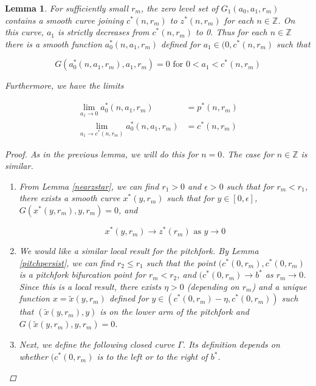 \documentclass[12pt]{article}
\def\Z{{\mathbb Z}}
\newtheorem{lemma}{Lemma}
\begin{document}
\begin{lemma}
For sufficiently small $r_m$, the zero level set of $G_1(a_0, a_1, r_m)$ contains a smooth curve joining $c^*(n, r_m)$ to $z^*(n, r_m)$ for each $n \in \Z$. On this curve, $a_1$ is strictly decreases from $c^*(n, r_m)$ to 0. Thus for each $n \in \Z$ there is a smooth function $a_0^*(n, a_1, r_m)$ defined for $a_1 \in (0, c^*(n, r_m)$ such that 

\begin{equation}
G(a_0^*(n, a_1, r_m), a_1, r_m) = 0 \text{  for  }
0 < a_1 < c^*(n, r_m)
\end{equation}

Furthermore, we have the limits

\begin{align*}
\lim_{a_1 \rightarrow 0} a_0^*(n, a_1, r_m) &= p^*(n, r_m) \\
\lim_{a_1 \rightarrow c^*(n, r_m)} a_0^*(n, a_1, r_m) &= c^*(n, r_m)
\end{align*}

\begin{proof}
As in the previous lemma, we will do this for $n = 0$. The case for $n \in \Z$ is similar.

\begin{enumerate}

\item From Lemma \ref{nearzstar}, we can find $r_1 > 0$ and $\epsilon > 0$ such that for $r_m < r_1$, there exists a smooth curve $x^*(y, r_m)$ such that for $y \in [0, \epsilon]$, $G(x^*(y, r_m), y, r_m) = 0$, and

\[
x^*(y, r_m) \rightarrow z^*(r_m) \text{ as } y \rightarrow 0
\]

\item We would like a similar local result for the pitchfork. By Lemma \ref{pitchpersist}, we can find $r_2 \leq r_1$ such that the point $(c^*(0, r_m), c^*(0, r_m)$ is a pitchfork bifurcation point for $r_m < r_2$, and $(c^*(0, r_m) \rightarrow b^*$ as $r_m \rightarrow 0$. Since this is a local result, there exists $\eta > 0$ (depending on $r_m$) and a unique function $x = \tilde{x}(y, r_m)$ defined for $y \in (c^*(0, r_m) - \eta, c^*(0, r_m))$ such that $(\tilde{x}(y, r_m), y)$ is on the lower arm of the pitchfork and $G(\tilde{x}(y, r_m), y, r_m) = 0$.

\item Next, we define the following closed curve $\Gamma$. Its definition depends on whether $(c^*(0, r_m)$ is to the left or to the right of $b^*$.


\end{enumerate}
\end{proof}
\end{lemma}
\end{document}

